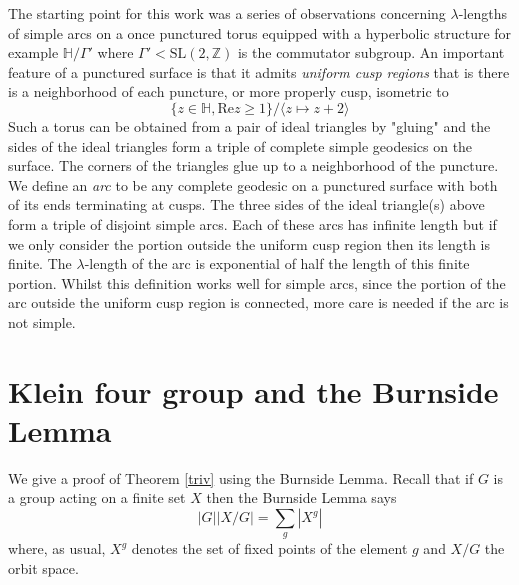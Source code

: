 \documentclass[12pt,a4paper]{amsart}
\def\HH{\mathbb{H}}
\def\ZZ{\mathbb{Z}}
\def\sl2{\mathrm{SL}(2, \ZZ)}
\begin{document}
The starting point for this work was a series of observations
concerning $\lambda$-lengths of simple arcs on a once punctured
torus equipped with a hyperbolic structure for example $\HH/\Gamma'$
where $\Gamma' < \sl2$ is the commutator subgroup. An important
feature of a punctured surface is that it admits \textit{uniform
cusp regions} that is there is a neighborhood of each puncture, or more properly cusp, isometric to 
$$\{z\in \mathbb{H}, \mathrm{Re}z \geq 1\}/\langle z \mapsto z+2 \rangle$$  
Such a torus can
be obtained from a pair of ideal triangles by "gluing" and the sides
of the ideal triangles form a triple of complete simple geodesics on
the surface. The corners of the triangles glue up to a neighborhood
of the puncture. We define an \textit{arc} to
be any complete geodesic on a punctured surface with both of its
ends terminating at cusps. The three sides of the ideal triangle(s)
above form a triple of disjoint simple arcs. Each of these arcs has
infinite length but if we only consider the portion outside the
uniform cusp region then its length is finite. The $\lambda$-length
of the arc is exponential of half the length of this finite portion.
Whilst this definition works well for simple arcs, since the portion of
the arc
outside the uniform cusp region is connected, more care is needed if
the arc is not simple.


\section{Klein four group and the Burnside Lemma}

We give a proof of Theorem \ref{triv} using the Burnside Lemma.
Recall that if $G$ is  a group acting on a finite set $X$ then the Burnside Lemma says
\begin{equation}\label{burnside}
|G| |X/G| = \sum_{g} |X^g| 
\end{equation}  
where, as usual, 
 $X^g$ denotes the set of fixed points of the element $g$ 
 and $X/G$  the orbit space.
\end{document}
